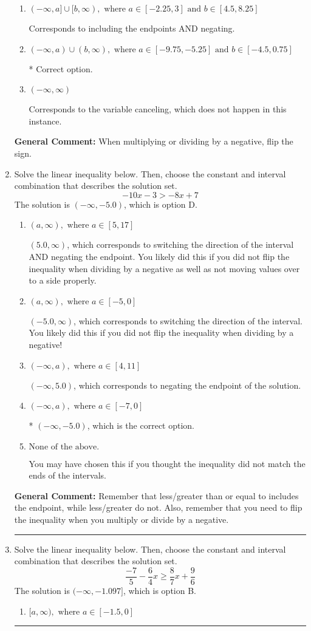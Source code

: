 \documentclass{extbook}[14pt]
\newcommand{\litem}[1]{\item #1

\rule{\textwidth}{0.4pt}}
\begin{document}
\begin{enumerate}
{\begin{enumerate}[label=\Alph*.]
Corresponds to inverting the inequality and negating the solution.
\item \( (-\infty, a] \cup [b, \infty), \text{ where } a \in [-2.25, 3] \text{ and } b \in [4.5, 8.25] \)

Corresponds to including the endpoints AND negating.
\item \( (-\infty, a) \cup (b, \infty), \text{ where } a \in [-9.75, -5.25] \text{ and } b \in [-4.5, 0.75] \)

 * Correct option.
\item \( (-\infty, \infty) \)

Corresponds to the variable canceling, which does not happen in this instance.
\end{enumerate}

\textbf{General Comment:} When multiplying or dividing by a negative, flip the sign.
}
\litem{
Solve the linear inequality below. Then, choose the constant and interval combination that describes the solution set.
\[ -10x -3 > -8x + 7 \]The solution is \( (-\infty, -5.0) \), which is option D.\begin{enumerate}[label=\Alph*.]
\item \( (a, \infty), \text{ where } a \in [5, 17] \)

 $(5.0, \infty)$, which corresponds to switching the direction of the interval AND negating the endpoint. You likely did this if you did not flip the inequality when dividing by a negative as well as not moving values over to a side properly.
\item \( (a, \infty), \text{ where } a \in [-5, 0] \)

 $(-5.0, \infty)$, which corresponds to switching the direction of the interval. You likely did this if you did not flip the inequality when dividing by a negative!
\item \( (-\infty, a), \text{ where } a \in [4, 11] \)

 $(-\infty, 5.0)$, which corresponds to negating the endpoint of the solution.
\item \( (-\infty, a), \text{ where } a \in [-7, 0] \)

* $(-\infty, -5.0)$, which is the correct option.
\item \( \text{None of the above}. \)

You may have chosen this if you thought the inequality did not match the ends of the intervals.
\end{enumerate}

\textbf{General Comment:} Remember that less/greater than or equal to includes the endpoint, while less/greater do not. Also, remember that you need to flip the inequality when you multiply or divide by a negative.
}
\litem{
Solve the linear inequality below. Then, choose the constant and interval combination that describes the solution set.
\[ \frac{-7}{5} - \frac{6}{4} x \geq \frac{8}{7} x + \frac{9}{6} \]The solution is \( (-\infty, -1.097] \), which is option B.\begin{enumerate}[label=\Alph*.]
\item \( [a, \infty), \text{ where } a \in [-1.5, 0] \)


\end{enumerate}}
\end{enumerate}
\end{document}
